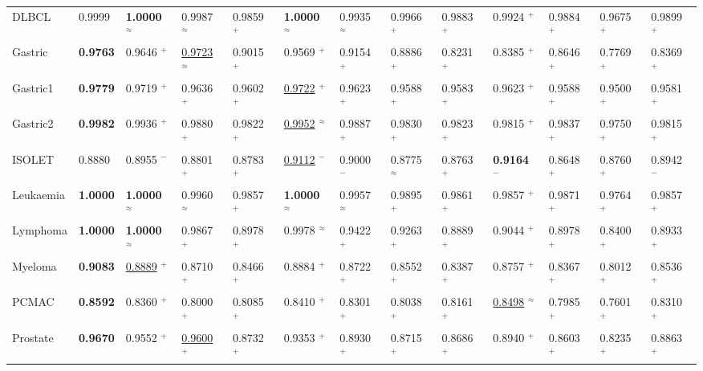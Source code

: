 \begin{table}[t]
{\begin{tabular}{l *{12}{w{c}{33pt}}}
DLBCL            & 0.9999 & \textbf{1.0000} $^{\approx}$ & 0.9987 $^{\approx}$ & 0.9859 $^{+}$ & \textbf{1.0000} $^{\approx}$ & 0.9935 $^{\approx}$ & 0.9966 $^{+}$ & 0.9883 $^{+}$ & 0.9924 $^{+}$ & 0.9884 $^{+}$ & 0.9675 $^{+}$ & 0.9899 $^{+}$ \\
Gastric          & \textbf{0.9763} & 0.9646 $^{+}$ & \underline{0.9723} $^{\approx}$ & 0.9015 $^{+}$ & 0.9569 $^{+}$ & 0.9154 $^{+}$ & 0.8886 $^{+}$ & 0.8231 $^{+}$ & 0.8385 $^{+}$ & 0.8646 $^{+}$ & 0.7769 $^{+}$ & 0.8369 $^{+}$ \\
Gastric1         & \textbf{0.9779} & 0.9719 $^{+}$ & 0.9636 $^{+}$ & 0.9602 $^{+}$ & \underline{0.9722} $^{+}$ & 0.9623 $^{+}$ & 0.9588 $^{+}$ & 0.9583 $^{+}$ & 0.9623 $^{+}$ & 0.9588 $^{+}$ & 0.9500 $^{+}$ & 0.9581 $^{+}$ \\
Gastric2         & \textbf{0.9982} & 0.9936 $^{+}$ & 0.9880 $^{+}$ & 0.9822 $^{+}$ & \underline{0.9952} $^{\approx}$ & 0.9887 $^{+}$ & 0.9830 $^{+}$ & 0.9823 $^{+}$ & 0.9815 $^{+}$ & 0.9837 $^{+}$ & 0.9750 $^{+}$ & 0.9815 $^{+}$ \\
ISOLET           & 0.8880 & 0.8955 $^{-}$ & 0.8801 $^{+}$ & 0.8783 $^{+}$ & \underline{0.9112} $^{-}$ & 0.9000 $^{-}$ & 0.8775 $^{\approx}$ & 0.8763 $^{+}$ & \textbf{0.9164} $^{-}$ & 0.8648 $^{+}$ & 0.8760 $^{+}$ & 0.8942 $^{-}$ \\
Leukaemia        & \textbf{1.0000} & \textbf{1.0000} $^{\approx}$ & 0.9960 $^{\approx}$ & 0.9857 $^{+}$ & \textbf{1.0000} $^{\approx}$ & 0.9957 $^{\approx}$ & 0.9895 $^{+}$ & 0.9861 $^{+}$ & 0.9857 $^{+}$ & 0.9871 $^{+}$ & 0.9764 $^{+}$ & 0.9857 $^{+}$ \\
Lymphoma         & \textbf{1.0000} & \textbf{1.0000} $^{\approx}$ & 0.9867 $^{+}$ & 0.8978 $^{+}$ & 0.9978 $^{\approx}$ & 0.9422 $^{+}$ & 0.9263 $^{+}$ & 0.8889 $^{+}$ & 0.9044 $^{+}$ & 0.8978 $^{+}$ & 0.8400 $^{+}$ & 0.8933 $^{+}$ \\
Myeloma          & \textbf{0.9083} & \underline{0.8889} $^{+}$ & 0.8710 $^{+}$ & 0.8466 $^{+}$ & 0.8884 $^{+}$ & 0.8722 $^{+}$ & 0.8552 $^{+}$ & 0.8387 $^{+}$ & 0.8757 $^{+}$ & 0.8367 $^{+}$ & 0.8012 $^{+}$ & 0.8536 $^{+}$ \\
PCMAC            & \textbf{0.8592} & 0.8360 $^{+}$ & 0.8000 $^{+}$ & 0.8085 $^{+}$ & 0.8410 $^{+}$ & 0.8301 $^{+}$ & 0.8038 $^{+}$ & 0.8161 $^{+}$ & \underline{0.8498} $^{\approx}$ & 0.7985 $^{+}$ & 0.7601 $^{+}$ & 0.8310 $^{+}$ \\
Prostate         & \textbf{0.9670} & 0.9552 $^{+}$ & \underline{0.9600} $^{+}$ & 0.8732 $^{+}$ & 0.9353 $^{+}$ & 0.8930 $^{+}$ & 0.8715 $^{+}$ & 0.8686 $^{+}$ & 0.8940 $^{+}$ & 0.8603 $^{+}$ & 0.8235 $^{+}$ & 0.8863 $^{+}$ \\

\end{tabular}}
\end{table}
